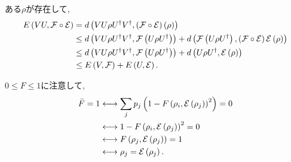 \begin{ex}
    ある$\rho$が存在して,
    \begin{align*}
        E\left( VU, \mathcal{F} \circ \mathcal{E}\right)
         & =
        d\left( VU\rho U^\dagger V^\dagger, \left(\mathcal{F} \circ \mathcal{E}\right) \left(\rho \right)\right) \\
         & \leq
        d\left(
        VU\rho U^\dagger V^\dagger, \mathcal{F}\left(U\rho U^\dagger\right)\right)
        +
        d\left(
        \mathcal{F}\left(U\rho U^\dagger\right), \left( \mathcal{F} \circ \mathcal{E} \right)\mathcal{E}\left(\rho \right)
        \right)                                                                                   \\
         & \leq
        d\left(
        VU\rho U^\dagger V^\dagger, \mathcal{F}\left(U\rho U^\dagger\right)\right)
        +
        d\left(
        U\rho U^\dagger, \mathcal{E}\left(\rho \right)
        \right)                                                                                   \\
         & \leq
        E \left( V, \mathcal{F}\right) + E\left( U, \mathcal{E}\right).
    \end{align*}
\end{ex}

\begin{ex}
    $0 \leq F \leq 1 $に注意して,
    \begin{align*}
        \bar{F} = 1 
        &\longleftrightarrow
        \sum_j p_j \left( 1 - F \left( \rho_i, \mathcal{E}\left( \rho_j\right)\right)^2\right) = 0\\
        &\longleftrightarrow
        1 - F \left( \rho_i, \mathcal{E}\left( \rho_j\right)\right)^2 = 0 \\
        &\longleftrightarrow
        F \left( \rho_j, \mathcal{E} \left( \rho_j \right)\right) = 1 \\
        &\longleftrightarrow
        \rho_j =  \mathcal{E} \left( \rho_j \right).
    \end{align*} 
\end{ex}
